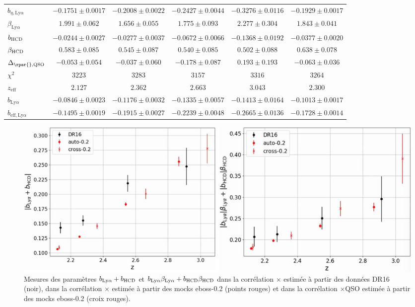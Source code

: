 \begin{table}[h]
\begin{tabular}{lccccc}
$b_{\eta, \mathrm{Ly}\alpha} $ & $ -0.1751 \pm 0.0017$ & $ -0.2008 \pm 0.0022$ & $ -0.2427 \pm 0.0044$ & $ -0.3276 \pm 0.0116$ & $ -0.1929 \pm 0.0017$ \\
$\beta_{\mathrm{Ly}\alpha} $ & $ 1.991 \pm 0.062$ & $ 1.656 \pm 0.055$ & $ 1.775 \pm 0.093$ & $ 2.277 \pm 0.304$ & $ 1.843 \pm 0.041$ \\
$b_{\textsc{HCD}} $ & $ -0.0244 \pm 0.0027$ & $ -0.0277 \pm 0.0037$ & $ -0.0672 \pm 0.0066$ & $ -0.1368 \pm 0.0192$ & $ -0.0377 \pm 0.0020$ \\
$\beta_{\textsc{HCD}} $ & $ 0.583 \pm 0.085$ & $ 0.545 \pm 0.087$ & $ 0.540 \pm 0.085$ & $ 0.502 \pm 0.088$ & $ 0.638 \pm 0.078$ \\
$\Delta_{\rpar{}, \textsc{QSO}}$ & $ -0.053 \pm 0.054$ & $ -0.037 \pm 0.060$ & $ -0.178 \pm 0.087$ & $ 0.193 \pm 0.193$ & $ -0.063 \pm 0.036$ \\
\midrule
$\chi^2$ & $ 3223 $ & $ 3283 $ & $ 3157 $ & $ 3316 $ & $ 3264 $ \\
$z_{\mathrm{eff}}$ & $ 2.127 $ & $ 2.362 $ & $ 2.663 $ & $ 3.043 $ & $ 2.300 $ \\
\midrule
$b_{\mathrm{Ly}\alpha} $ & $ -0.0846 \pm 0.0023$ & $ -0.1176 \pm 0.0032$ & $ -0.1335 \pm 0.0057$ & $ -0.1413 \pm 0.0164$ & $ -0.1013 \pm 0.0017$ \\
$b_{\mathrm{eff}, \mathrm{Ly}\alpha} $ & $ -0.1495 \pm 0.0019$ & $ -0.1915 \pm 0.0027$ & $ -0.2239 \pm 0.0048$ & $ -0.2665 \pm 0.0136$ & $ -0.1728 \pm 0.0014$ \\
\bottomrule
  \end{tabular}
\end{table}

\begin{figure}
  \centering
  \includegraphics[scale=0.4]{sum_bias}
  \caption{Mesures des paramètres $b_{\mathrm{Ly}\alpha} + b_{\textsc{HCD}}$ et $b_{\mathrm{Ly}\alpha}\beta_{\mathrm{Ly}\alpha} + b_{\textsc{HCD}}\beta_{\textsc{HCD}}$ dans la corrélation \lya{}$\times$\lya{} estimée à partir des données DR16 (noir), dans la corrélation \lya{}$\times$\lya{} estimée à partir des mocks eboss-0.2 (points rouges) et dans la corrélation \lya{}$\times$QSO estimée à partir des mocks eboss-0.2 (croix rouges).}
  \label{fig:sum_bias}
\end{figure}

